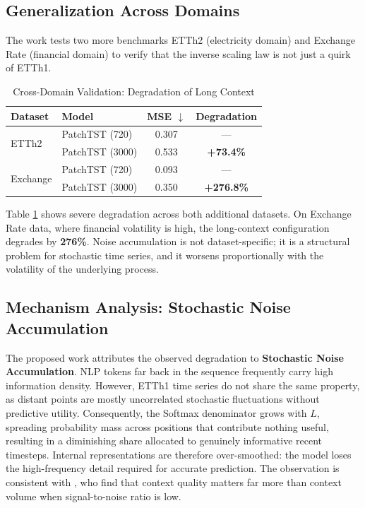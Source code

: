 \documentclass{article} %
\begin{document}
\subsection{Generalization Across Domains}
The work tests two more benchmarks ETTh2 \citep{zhou2021informer} (electricity domain) and Exchange Rate (financial domain) to verify that the inverse scaling law is not just a quirk of ETTh1.
\begin{table}[h]
\centering
\scriptsize
\caption{Cross-Domain Validation: Degradation of Long Context}
\label{tab:cross_domain}
\small
\begin{tabular}{llcc}
\toprule
\textbf{Dataset} & \textbf{Model} & \textbf{MSE $\downarrow$} & \textbf{Degradation} \\
\midrule
\multirow{2}{*}{ETTh2} & PatchTST (720) & 0.307 & --- \\
& PatchTST (3000) & 0.533 & \textbf{+73.4\%} \\
\midrule
\multirow{2}{*}{Exchange} & PatchTST (720) & 0.093 & --- \\
& PatchTST (3000) & 0.350 & \textbf{+276.8\%} \\
\bottomrule
\end{tabular}
\end{table}
Table \ref{tab:cross_domain} shows severe degradation across both additional datasets. On Exchange Rate data, where financial volatility is high, the long-context configuration degrades by \textbf{276\%}. Noise accumulation is not dataset-specific; it is a structural problem for stochastic time series, and it worsens proportionally with the volatility of the underlying process.

\subsection{Mechanism Analysis: Stochastic Noise Accumulation} \label{sec:entropy_analysis}
The proposed work attributes the observed degradation to \textbf{Stochastic Noise Accumulation}. NLP tokens far back in the sequence frequently carry high information density. However, ETTh1 time series do not share the same property, as distant points are mostly uncorrelated stochastic fluctuations without predictive utility. Consequently, the Softmax denominator grows with $L$, spreading probability mass across positions that contribute nothing useful, resulting in a diminishing share allocated to genuinely informative recent timesteps. Internal representations are therefore over-smoothed: the model loses the high-frequency detail required for accurate prediction. The observation is consistent with \cite{williams2025context}, who find that context quality matters far more than context volume when signal-to-noise ratio is low.
\end{document}
